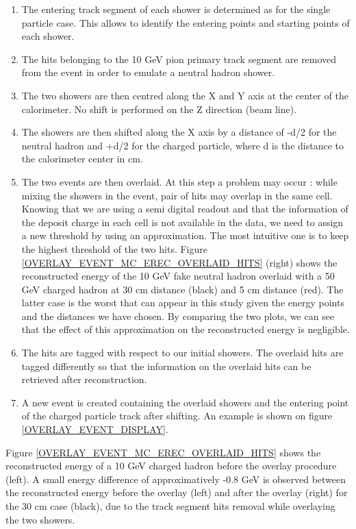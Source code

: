 \documentclass[12pt]{article}
\begin{document}
\begin{enumerate}
  \item The entering track segment of each shower is determined as for the single particle case. This allows to identify the entering points and starting points of each shower.
  \item The hits belonging to the 10 GeV pion primary track segment are removed from the event in order to emulate a neutral hadron shower.
  \item The two showers are then centred along the X and Y axis at the center of the calorimeter. No shift is performed on the Z direction (beam line).
  \item The showers are then shifted along the X axis by a distance of -d/2 for the neutral hadron and +d/2 for the charged particle, where d is the distance to the calorimeter center in cm.
  \item The two events are then overlaid. At this step a problem may occur : while mixing the showers in the event, pair of hits may overlap in the same cell. Knowing that we are using a semi digital readout and that the information of the deposit charge in each cell is not available in the data, we need to assign a new threshold by using an approximation. The most intuitive one is to keep the highest threshold of the two hits. Figure \ref{OVERLAY_EVENT_MC_EREC_OVERLAID_HITS} (right) shows the reconstructed energy of the 10 GeV fake neutral hadron overlaid with a 50 GeV charged hadron at 30 cm distance (black) and 5 cm distance (red). The latter case is the worst that can appear in this study given the energy points and the distances we have chosen. By comparing the two plots, we can see that the effect of this approximation on the reconstructed energy is negligible.
  \item The hits are tagged with respect to our initial showers. The overlaid hits are tagged differently so that the information on the overlaid hits can be retrieved after reconstruction.
  \item A new event is created containing the overlaid showers and the entering point of the charged particle track after shifting. An example is shown on figure \ref{OVERLAY_EVENT_DISPLAY}.
\end{enumerate}

Figure \ref{OVERLAY_EVENT_MC_EREC_OVERLAID_HITS} shows the reconstructed energy of a 10 GeV charged hadron before the overlay procedure (left). A small energy difference of approximatively -0.8 GeV is observed between the reconstructed energy before the overlay (left) and after the overlay (right) for the 30 cm case (black), due to the track segment hits removal while overlaying the two showers.
\end{document}
